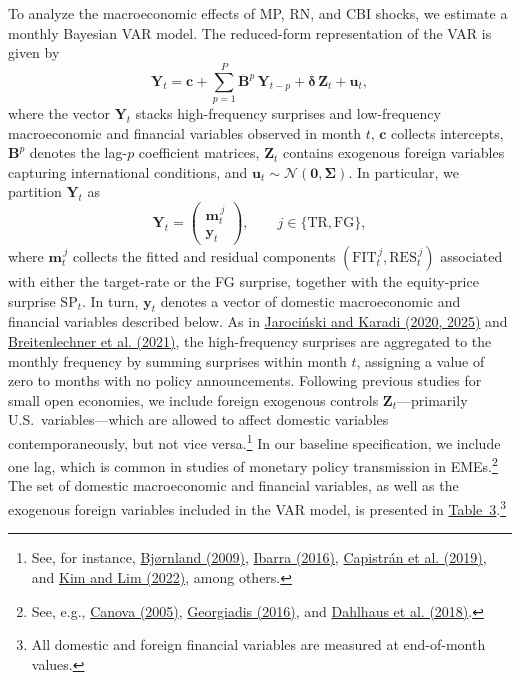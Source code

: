 \documentclass[12pt, reqno]{article}
\begin{document}
To analyze the macroeconomic effects of MP, RN, and CBI shocks, we estimate a monthly Bayesian VAR model. The reduced-form representation of the VAR is given by
\begin{equation}
  \boldsymbol{Y}_t
  = \boldsymbol{c}
  + \sum_{p=1}^{P} \boldsymbol{B}^{p}\,\boldsymbol{Y}_{t-p}
  + \boldsymbol{\delta}\,\boldsymbol{Z}_t
  + \boldsymbol{u}_t ,
\end{equation}
where the vector $\boldsymbol{Y}_t$ stacks high-frequency surprises and low-frequency macroeconomic and financial variables observed in month $t$, $\boldsymbol{c}$ collects intercepts, $\boldsymbol{B}^{p}$ denotes the lag-$p$ coefficient matrices, $\boldsymbol{Z}_t$ contains exogenous foreign variables capturing international conditions, and $\boldsymbol{u}_t \sim \mathcal{N}\!\left(\mathbf{0},\boldsymbol{\Sigma}\right)$. In particular, we partition $\boldsymbol{Y}_t$ as
\[
\boldsymbol{Y}_t =
\begin{pmatrix}
\boldsymbol{m}_t^{\,j} \\
\boldsymbol{y}_t
\end{pmatrix},
\qquad j \in \{\text{TR}, \text{FG}\},
\]
where $\boldsymbol{m}_t^{\,j}$ collects the fitted and residual components $(\text{FIT}_t^{\,j}, \text{RES}_t^{\,j})$ associated with either the target-rate or the FG surprise, together with the equity-price surprise $\text{SP}_t$. In turn, $\boldsymbol{y}_t$ denotes a vector of domestic macroeconomic and financial variables described below. As in \hyperlink{JK (2020)}{Jarociński and Karadi (2020, 2025)} and \hyperlink{Breitenlechner (2021)}{Breitenlechner et al. (2021)}, the high-frequency surprises are aggregated to the monthly frequency by summing surprises within month $t$, assigning a value of zero to months with no policy announcements. Following previous studies for small open economies, we include foreign exogenous controls $\boldsymbol{Z}_t$—primarily U.S.\ variables—which are allowed to affect domestic variables contemporaneously, but not vice versa.\footnote{See, for instance, \hyperlink{Bjørnland (2009)}{Bjørnland (2009)}, \hyperlink{Ibarra (2016)}{Ibarra (2016)}, \hyperlink{Capistrán et al. (2019)}{Capistrán et al. (2019)}, and \hyperlink{Kim and Lim (2022)}{Kim and Lim (2022)}, among others.} In our baseline specification, we include one lag, which is common in studies of monetary policy transmission in EMEs.\footnote{See, e.g., \hyperlink{Canova (2005)}{Canova (2005)}, \hyperlink{Georgiadis (2016)}{Georgiadis (2016)}, and \hyperlink{Dahlhaus et al. (2018)}{Dahlhaus et al. (2018)}.} The set of domestic macroeconomic and financial variables, as well as the exogenous foreign variables included in the VAR model, is presented in \hyperlink{Table 3}{Table~3}.\footnote{All domestic and foreign financial variables are measured at end-of-month values.}
\end{document}
